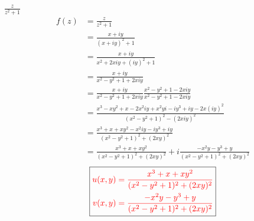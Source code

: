\item[12.] $\frac{z}{z^2+1}$
\begin{align*}
    f(z) 
    &= \frac{z}{z^2+1} \\
    &= \frac{x+iy}{(x+iy)^2+1}\\
    &= \frac{x+iy}{x^2+2xiy+(iy)^2+1}\\
    &= \frac{x+iy}{x^2-y^2+1+2xiy}\\
    &= \frac{x+iy}{x^2-y^2+1+2xiy}\frac{x^2-y^2+1-2xiy}{x^2-y^2+1-2xiy}\\
    &= \frac{x^3-xy^2+x-2x^2iy+x^2yi-iy^3+iy-2x(iy)^2}{(x^2-y^2+1)^2-(2xiy)^2}\\
    &= \frac{x^3+x+xy^2-x^2iy-iy^3+iy}{(x^2-y^2+1)^2+(2xy)^2}\\
    &= \frac{x^3+x+xy^2}{(x^2-y^2+1)^2+(2xy)^2}+i\frac{-x^2y-y^3+y}{(x^2-y^2+1)^2+(2xy)^2}
\end{align*}
\[
\boxed{
\textcolor{red}{
\begin{aligned}
u(x,y) &= \frac{x^3+x+xy^2}{(x^2-y^2+1)^2+(2xy)^2} \\
v(x,y) &= \frac{-x^2y-y^3+y}{(x^2-y^2+1)^2+(2xy)^2}
\end{aligned}
}
}
\]
